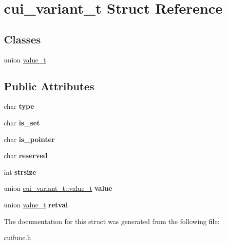 \hypertarget{structcui__variant__t}{\section{cui\-\_\-variant\-\_\-t Struct Reference}
\label{structcui__variant__t}
}
\subsection*{Classes}
\begin{DoxyCompactItemize}
\item 
union \hyperlink{unioncui__variant__t_1_1value__t}{value\-\_\-t}
\end{DoxyCompactItemize}
\subsection*{Public Attributes}
\begin{DoxyCompactItemize}
\item 
\hypertarget{structcui__variant__t_a0f20b7f15c606739817bef082cdedc4a}{char {\bfseries type}}\label{structcui__variant__t_a0f20b7f15c606739817bef082cdedc4a}

\item 
\hypertarget{structcui__variant__t_a6c734e416bcb6d656871ddf29cc433d7}{char {\bfseries is\-\_\-set}}\label{structcui__variant__t_a6c734e416bcb6d656871ddf29cc433d7}

\item 
\hypertarget{structcui__variant__t_a20bfb098bcefa87348137c8e2739fb2a}{char {\bfseries is\-\_\-pointer}}\label{structcui__variant__t_a20bfb098bcefa87348137c8e2739fb2a}

\item 
\hypertarget{structcui__variant__t_a815b988c4d0e832bbc2bb20f0afff047}{char {\bfseries reserved}}\label{structcui__variant__t_a815b988c4d0e832bbc2bb20f0afff047}

\item 
\hypertarget{structcui__variant__t_afaf975940fb9e8a02c1415c765b68754}{int {\bfseries strsize}}\label{structcui__variant__t_afaf975940fb9e8a02c1415c765b68754}

\item 
\hypertarget{structcui__variant__t_a3b044e253b03df3f7fa86e3b0e2516ae}{union \hyperlink{unioncui__variant__t_1_1value__t}{cui\-\_\-variant\-\_\-t\-::value\-\_\-t} {\bfseries value}}\label{structcui__variant__t_a3b044e253b03df3f7fa86e3b0e2516ae}

\item 
\hypertarget{structcui__variant__t_a5cd88a965e1b399b6bc0386b04c354d7}{union \hyperlink{unioncui__variant__t_1_1value__t}{value\-\_\-t} {\bfseries retval}}\label{structcui__variant__t_a5cd88a965e1b399b6bc0386b04c354d7}

\end{DoxyCompactItemize}


The documentation for this struct was generated from the following file\-:\begin{DoxyCompactItemize}
\item 
cuifunc.\-h\end{DoxyCompactItemize}
